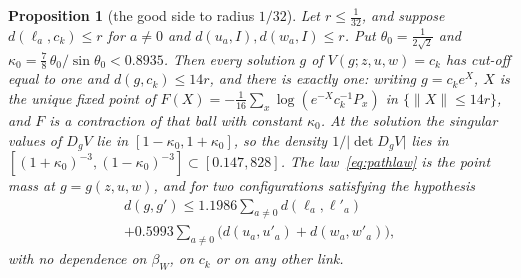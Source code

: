 \documentclass[11pt]{amsart}
\newtheorem{proposition}[theorem]{Proposition}
\theoremstyle{definition}
\theoremstyle{remark}
\numberwithin{equation}{section}
\begin{document}
\begin{proposition}[the good side to radius $1/32$]\label{prop:goodside}
Let $r\le\frac1{32}$, and suppose $d(\ell_a,c_k)\le r$ for $a\ne0$ and
$d(u_a,I),d(w_a,I)\le r$. Put $\theta_0=\frac1{2\sqrt2}$ and $\kappa_0=
\frac78\,\theta_0/\sin\theta_0<0.8935$. Then every solution $g$ of $V(g;z,u,
w)=c_k$ has cut-off equal to one and $d(g,c_k)\le14r$, and there is exactly
one: writing $g=c_ke^X$, $X$ is the unique fixed point of $F(X)=-\frac1{16}
\sum_x\log(e^{-X}c_k^{-1}P_x)$ in $\{\lVert X\rVert\le14r\}$, and $F$ is a
contraction of that ball with constant $\kappa_0$. At the solution the
singular values of $D_gV$ lie in $[1-\kappa_0,1+\kappa_0]$, so the density
$1/\lvert\det D_gV\rvert$ lies in $[(1+\kappa_0)^{-3},(1-\kappa_0)^{-3}]\subset
[0.147,828]$. The law~\eqref{eq:pathlaw} is the point mass at $g=g(z,u,w)$,
and for two configurations satisfying the hypothesis
\begin{multline*}
d(g,g')\le1.1986\sum_{a\ne0}d(\ell_a,\ell'_a)\\
+0.5993\sum_{a\ne0}\bigl(d(u_a,u'_a)+d(w_a,w'_a)\bigr),
\end{multline*}
with no dependence on $\beta_W$, on $c_k$ or on any other link.
\end{proposition}
\end{document}
